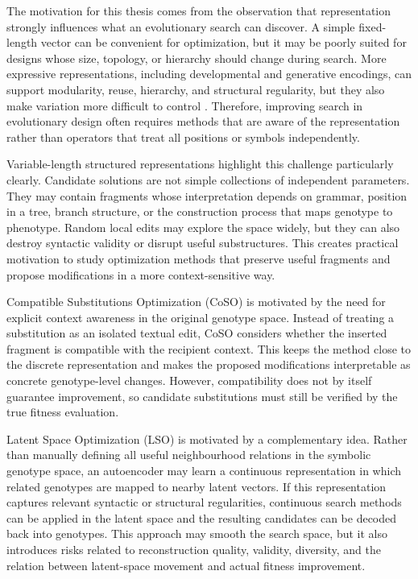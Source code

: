 The motivation for this thesis comes from the observation that representation strongly influences what an evolutionary search can discover. A simple fixed-length vector can be convenient for optimization, but it may be poorly suited for designs whose size, topology, or hierarchy should change during search. More expressive representations, including developmental and generative encodings, can support modularity, reuse, hierarchy, and structural regularity, but they also make variation more difficult to control \cite{bentley1999three,hornby2003generative,kicinger2005evolutionary}. Therefore, improving search in evolutionary design often requires methods that are aware of the representation rather than operators that treat all positions or symbols independently.

Variable-length structured representations highlight this challenge particularly clearly. Candidate solutions are not simple collections of independent parameters. They may contain fragments whose interpretation depends on grammar, position in a tree, branch structure, or the construction process that maps genotype to phenotype. Random local edits may explore the space widely, but they can also destroy syntactic validity or disrupt useful substructures. This creates practical motivation to study optimization methods that preserve useful fragments and propose modifications in a more context-sensitive way.

Compatible Substitutions Optimization (CoSO) is motivated by the need for explicit context awareness in the original genotype space. Instead of treating a substitution as an isolated textual edit, CoSO considers whether the inserted fragment is compatible with the recipient context. This keeps the method close to the discrete representation and makes the proposed modifications interpretable as concrete genotype-level changes. However, compatibility does not by itself guarantee improvement, so candidate substitutions must still be verified by the true fitness evaluation.

Latent Space Optimization (LSO) is motivated by a complementary idea. Rather than manually defining all useful neighbourhood relations in the symbolic genotype space, an autoencoder may learn a continuous representation in which related genotypes are mapped to nearby latent vectors. If this representation captures relevant syntactic or structural regularities, continuous search methods can be applied in the latent space and the resulting candidates can be decoded back into genotypes. This approach may smooth the search space, but it also introduces risks related to reconstruction quality, validity, diversity, and the relation between latent-space movement and actual fitness improvement.

